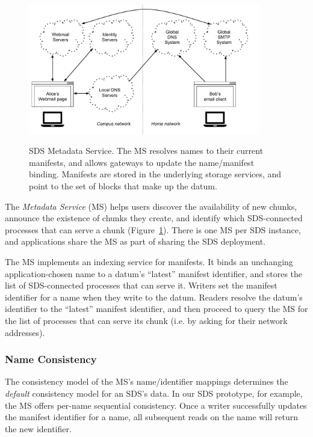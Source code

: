 \begin{figure}[h]
   \caption{SDS Metadata Service.  The MS resolves names to their current
   manifests, and allows gateways to update the name/manifest binding.
   Manifests are stored in the underlying storage services, and
   point to the set of blocks that make up the datum.}
   \centering
   \includegraphics[width=0.9\textwidth,page=5]{figures/dissertation-figures}
   \label{fig:chap2-metadata-service}
\end{figure}

The \emph{Metadata Service} (MS) helps users discover the
availability of new chunks, announce the existence of chunks they create, and
identify which SDS-connected processes that can serve a chunk
(Figure~\ref{fig:chap2-metadata-service}).
There is one MS per SDS instance, and
applications share the MS as part of sharing the SDS deployment.

The MS implements an indexing service for manifests.  It binds an unchanging
application-chosen name to a datum's ``latest'' manifest
identifier, and stores the list of SDS-connected processes that can serve it.
Writers set the manifest identifier for a name when they write to the datum.
Readers resolve the datum's identifier to the ``latest'' manifest identifier,
and then proceed to query the MS for the list of processes that can serve its
chunk (i.e. by asking for their network addresses).

\subsubsection{Name Consistency}

The consistency model of the MS's name/identifier mappings determines the \emph{default}
consistency model for an SDS's data.
In our SDS prototype, for example, the MS offers
per-name sequential consistency.  Once a writer successfully updates the manifest
identifier for a name, all subsequent reads on the name will return the new
identifier.

